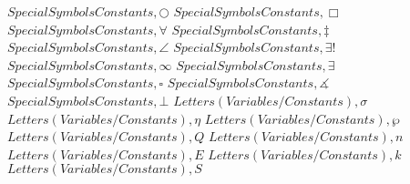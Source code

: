 \documentclass{article}
\begin{document}
$Special Symbols Constants,\bigcirc$
\linebreak
\linebreak
$Special Symbols Constants,\Box$
\linebreak
\linebreak
$Special Symbols Constants,\forall$
\linebreak
\linebreak
$Special Symbols Constants,\ddagger$
\linebreak
\linebreak
$Special Symbols Constants,\angle$
\linebreak
\linebreak
$Special Symbols Constants,\exists!$
\linebreak
\linebreak
$Special Symbols Constants,\infty$
\linebreak
\linebreak
$Special Symbols Constants,\exists$
\linebreak
\linebreak
$Special Symbols Constants,\square$
\linebreak
\linebreak
$Special Symbols Constants,\measuredangle$
\linebreak
\linebreak
$Special Symbols Constants,\bot$
\linebreak
\linebreak
$Letters (Variables/Constants),\sigma$
\linebreak
\linebreak
$Letters (Variables/Constants),\eta$
\linebreak
\linebreak
$Letters (Variables/Constants),\wp$
\linebreak
\linebreak
$Letters (Variables/Constants),Q$
\linebreak
\linebreak
$Letters (Variables/Constants),n$
\linebreak
\linebreak
$Letters (Variables/Constants),E$
\linebreak
\linebreak
$Letters (Variables/Constants),k$
\linebreak
\linebreak
$Letters (Variables/Constants),S$
\linebreak
\linebreak
\end{document}
